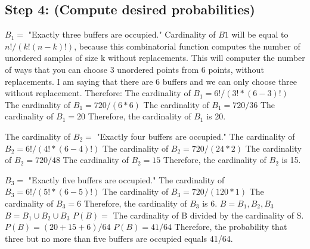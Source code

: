 \documentclass[a4paper,10pt]{article}
\begin{document}
\subsection{Step 4: (Compute desired probabilities)}
$ B_{1} = $ "Exactly three buffers are occupied."
Cardinality of $ B{1} $ will be equal to $ n!/(k!(n-k)!) $, because this combinatorial function computes the number 
of unordered samples of size k without replacements. This will computer the number of ways that you can choose 3 
unordered points from 6 points, without replacements. I am saying that there are 6 buffers and we can only 
choose three without replacement. Therefore: \newline
The cardinality of $ B_{1} = 6!/(3!*(6-3)!) $ \newline
The cardinality of $ B_{1} = 720/(6*6) $ \newline
The cardinality of $ B_{1} = 720/36 $ \newline
The cardinality of $ B_{1} = 20 $ \newline
Therefore, the cardinality of $ B_{1} $ is 20. \newline

The cardinality of $ B_{2} = $ "Exactly four buffers are occupied."
The cardinality of $ B_{2} = 6!/(4!*(6-4)!) $ \newline
The cardinality of $ B_{2} = 720/(24*2) $ \newline
The cardinality of $ B_{2} = 720/48 $ \newline
The cardinality of $ B_{2} = 15 $ \newline
Therefore, the cardinality of $ B_{2} $ is 15. \newline

$ B_{3} = $ "Exactly five buffers are occupied."
The cardinality of $ B_{3} = 6!/(5!*(6-5)!) $ \newline
The cardinality of $ B_{3} = 720/(120*1) $
The cardinality of $ B_{3} = 6 $ \newline
Therefore, the cardinality of $ B_{3} $ is 6. \newline
$ B = {B_{1}, B_{2}, B_{3}} $ \newline
$ B = B_{1} \cup B_{2} \cup B_{3} $ \newline
$ P(B) = $ The cardinality of B divided by the cardinality of S. \newline
$ P(B) = (20+15+6)/64 $ \newline
$ P(B) = 41 /64 $ \newline
Therefore, the probability that three but no more than five buffers are occupied equals 41/64.
\end{document}
